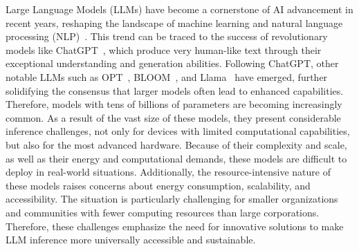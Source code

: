 Large Language Models (LLMs) have become a cornerstone of AI advancement in recent years, reshaping the landscape of machine learning and natural language processing (NLP)~\citep{zhao2023survey}. This trend can be traced to the success of revolutionary models like ChatGPT~\citep{brown2020language,ouyang2022training}, which produce very human-like text through their exceptional understanding and generation abilities. 
Following ChatGPT, other notable LLMs such as OPT~\citep{zhang2022opt}, BLOOM~\citep{scao2022bloom}, and Llama~\citep{touvron2023llama1,touvron2023llama2} have emerged, further solidifying the consensus that larger models often lead to enhanced capabilities. Therefore, models with tens of billions of parameters are becoming increasingly common. 
As a result of the vast size of these models, they present considerable inference challenges, not only for devices with limited computational capabilities, but also for the most advanced hardware. 
Because of their complexity and scale, as well as their energy and computational demands, these models are difficult to deploy in real-world situations. 
Additionally, the resource-intensive nature of these models raises concerns about energy consumption, scalability, and accessibility. The situation is particularly challenging for smaller organizations and communities with fewer computing resources than large corporations. Therefore, these challenges emphasize the need for innovative solutions to make LLM inference more universally accessible and sustainable.


